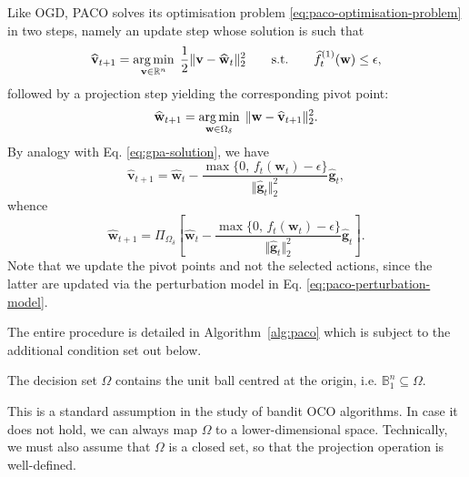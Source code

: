 Like OGD, PACO solves its optimisation problem \eqref{eq:paco-optimisation-problem} in two steps, namely an update step whose solution is such that
\begin{equation}
	\widehat{\mathbf{v}}_{t+1}
	= \operatorname*{arg\,min}_{\mathbf{v} \in \mathbb{R}^n} \; \frac{1}{2}\Vert\mathbf{v} - \widehat{\mathbf{w}}_t\Vert_2^2
	\qquad \text{s.t.} \qquad \widehat{f}_t^{(1)}(\mathbf{w}) \leq \epsilon,
\end{equation}
followed by a projection step yielding the corresponding pivot point:
\begin{equation}
	\widehat{\mathbf{w}}_{t+1}
	= \operatorname*{arg\,min}_{\mathbf{w} \in \Omega_\delta} \; \Vert\mathbf{w} - \widehat{\mathbf{v}}_{t+1}\Vert_2^2.
\end{equation}
By analogy with Eq. \eqref{eq:gpa-solution}, we have
\begin{equation}
	\widehat{\mathbf{v}}_{t+1}
	= \widehat{\mathbf{w}}_t - \frac{\max\{0,\, f_t(\mathbf{w}_t) - \epsilon\}}{\Vert\widehat{\mathbf{g}}_t\Vert_2^2}\widehat{\mathbf{g}}_t,
\end{equation}
whence
\begin{equation}
\label{eq:paco-solution}
	\widehat{\mathbf{w}}_{t+1}
	= \Pi_{\Omega_\delta}\left[\widehat{\mathbf{w}}_t - \frac{\max\{0,\, f_t(\mathbf{w}_t) - \epsilon\}}{\Vert\widehat{\mathbf{g}}_t\Vert_2^2}\widehat{\mathbf{g}}_t\right].
\end{equation}
Note that we update the pivot points and not the selected actions, since the latter are updated via the perturbation model in Eq. \eqref{eq:paco-perturbation-model}.
\begin{mccorrection}
The entire procedure is detailed in Algorithm~\ref{alg:paco} which is subject to the additional condition set out below.
\begin{assumption}
\label{ass:bounded-decision-set}
The decision set $\Omega$ contains the unit ball centred at the origin, i.e. $\mathbb{B}^n_1 \subseteq \Omega$.
\end{assumption}
This is a standard assumption in the study of bandit OCO algorithms. In case it does not hold, we can always map $\Omega$ to a lower-dimensional space.
Technically, we must also assume that $\Omega$ is a closed set, so that the projection operation is well-defined. 
\end{mccorrection}
